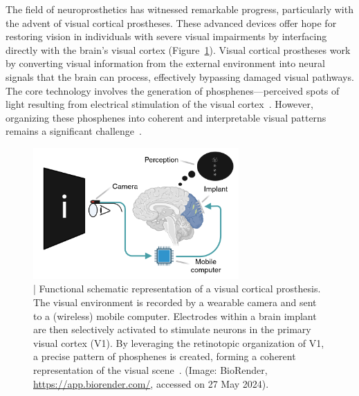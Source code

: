 \documentclass[twocolumn,10pt]{article}
\begin{document}
The field of neuroprosthetics has witnessed remarkable progress, particularly
with the advent of visual cortical prostheses. These advanced devices offer hope
for restoring vision in individuals with severe visual impairments by
interfacing directly with the brain's visual cortex
(Figure~\ref{fig:schematic}). Visual cortical prostheses work by converting
visual information from the external environment into neural signals that the
brain can process, effectively bypassing damaged visual pathways. The core
technology involves the generation of phosphenes---perceived spots of light
resulting from electrical stimulation of the visual
cortex~\parencite{vandergrintenBiologicallyPlausiblePhosphene2024a}. However,
organizing these phosphenes into coherent and interpretable visual patterns
remains a significant challenge~\parencite{merabetWhatBlindnessCan2005}.

\pagestyle{rest} %

\begin{figure}[ht!]
      \centering
      \includegraphics[width=0.7\textwidth]{imgs/visual_cortical_prothesis.png}
      \caption{| Functional schematic representation of a visual cortical
            prosthesis. The visual environment is recorded by a wearable camera
            and sent to a (wireless) mobile computer. Electrodes within a brain
            implant are then selectively activated to stimulate neurons in the
            primary visual cortex (V1). By leveraging the retinotopic
            organization of V1, a precise pattern of phosphenes is created,
            forming a coherent representation of the visual
            scene~\parencite{chenShapePerceptionHighchannelcount2020}. (Image:
            BioRender,
            \href{https://app.biorender.com/}{https://app.biorender.com/},
            accessed on 27 May 2024).}\label{fig:schematic}
\end{figure}
\end{document}
